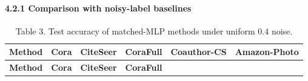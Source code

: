 \paragraph{4.2.1 Comparison with noisy-label baselines}\label{comparison-with-noisy-label-baselines}

\begin{longtable}[]{@{}
  >{\raggedright\arraybackslash}p{}
  >{\centering\arraybackslash}p{}
  >{\centering\arraybackslash}p{}
  >{\centering\arraybackslash}p{}
  >{\centering\arraybackslash}p{}
  >{\centering\arraybackslash}p{}@{}}
\caption{Table 3. Test accuracy of matched-MLP methods under uniform 0.4 noise.}\tabularnewline
\toprule\noalign{}
\begin{minipage}[b]{\linewidth}\raggedright
\textbf{Method}
\end{minipage} & \begin{minipage}[b]{\linewidth}\centering
\textbf{Cora}
\end{minipage} & \begin{minipage}[b]{\linewidth}\centering
\textbf{CiteSeer}
\end{minipage} & \begin{minipage}[b]{\linewidth}\centering
\textbf{CoraFull}
\end{minipage} & \begin{minipage}[b]{\linewidth}\centering
\textbf{Coauthor-CS}
\end{minipage} & \begin{minipage}[b]{\linewidth}\centering
\textbf{Amazon-Photo}
\end{minipage} \\
\midrule\noalign{}
\endfirsthead
\toprule\noalign{}
\begin{minipage}[b]{\linewidth}\raggedright
\textbf{Method}
\end{minipage} & \begin{minipage}[b]{\linewidth}\centering
\textbf{Cora}
\end{minipage} & \begin{minipage}[b]{\linewidth}\centering
\textbf{CiteSeer}
\end{minipage} & \begin{minipage}[b]{\linewidth}\centering
\textbf{CoraFull}
\end{minipage} & \begin{minipage}[b]{\linewidth}\centering

\end{minipage}
\end{longtable}
